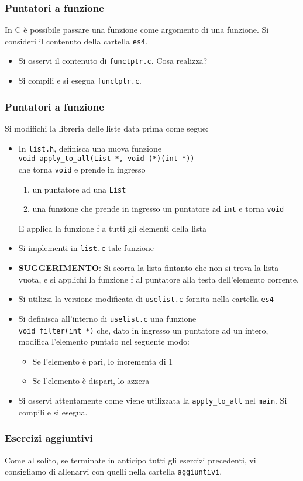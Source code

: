 \documentclass{beamer}
\begin{document}
\begin{frame}[fragile]
\frametitle{Puntatori a funzione}
In C è possibile passare una funzione come argomento di una funzione. Si consideri il contenuto della cartella \texttt{es4}.
\begin{itemize}
 \item Si osservi il contenuto di \texttt{functptr.c}. Cosa realizza?
 \item Si compili e si esegua \texttt{functptr.c}.
\end{itemize}
\end{frame}

\begin{frame}[fragile]
\frametitle{Puntatori a funzione}
Si modifichi la libreria delle liste data prima come segue:
\begin{itemize}
 \item In \texttt{list.h}, definisca una nuova funzione\\ \texttt{void apply\_to\_all(List *, void (*)(int *))}\\ che torna \texttt{void} e prende in ingresso
 \begin{enumerate}
  \scriptsize
  \item un puntatore ad una \texttt{List}
  \item una funzione che prende in ingresso un puntatore ad \texttt{int} e torna \texttt{void}
 \end{enumerate}
 E applica la funzione f a tutti gli elementi della lista
 \item Si implementi in \texttt{list.c} tale funzione
 \scriptsize
 \item \textbf{SUGGERIMENTO}: Si scorra la lista fintanto che non si trova la lista vuota, e si applichi la funzione f al puntatore alla testa dell'elemento corrente.
 \normalsize
 \item Si utilizzi la versione modificata di \texttt{uselist.c} fornita nella cartella \texttt{es4}
 \item Si definisca all'interno di \texttt{uselist.c} una funzione \\ \texttt{void filter(int *)} che, dato in ingresso un puntatore ad un intero, modifica l'elemento puntato nel seguente modo:
 \begin{itemize}
  \item Se l'elemento è pari, lo incrementa di 1
  \item Se l'elemento è dispari, lo azzera
 \end{itemize}
 \item Si osservi attentamente come viene utilizzata la \texttt{apply\_to\_all} nel \texttt{main}. Si compili e si esegua.
\end{itemize}
\end{frame}

\begin{frame}[fragile]
\frametitle{Esercizi aggiuntivi}
Come al solito, se terminate in anticipo tutti gli esercizi precedenti, vi consigliamo di allenarvi con quelli nella cartella \texttt{aggiuntivi}.
\end{frame}
\end{document}
